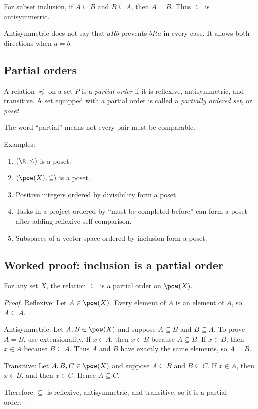 For subset inclusion, if $A\subseteq B$ and $B\subseteq A$, then $A=B$. Thus $\subseteq$ is antisymmetric.

\begin{trapbox}
Antisymmetric does not say that $aRb$ prevents $bRa$ in every case. It allows both directions when $a=b$.
\end{trapbox}

\subsection{Partial orders}

\begin{definition}
A relation $\preceq$ on a set $P$ is a \emph{partial order} if it is reflexive, antisymmetric, and transitive. A set equipped with a partial order is called a \emph{partially ordered set}, or \emph{poset}.
\end{definition}

The word ``partial'' means not every pair must be comparable.

Examples:

\begin{enumerate}
\item $(\R,\leq)$ is a poset.
\item $(\pow(X),\subseteq)$ is a poset.
\item Positive integers ordered by divisibility form a poset.
\item Tasks in a project ordered by ``must be completed before'' can form a poset after adding reflexive self-comparison.
\item Subspaces of a vector space ordered by inclusion form a poset.
\end{enumerate}

\subsection{Worked proof: inclusion is a partial order}

\begin{theorem}
For any set $X$, the relation $\subseteq$ is a partial order on $\pow(X)$.
\end{theorem}

\begin{proof}
Reflexive: Let $A\in\pow(X)$. Every element of $A$ is an element of $A$, so $A\subseteq A$.

Antisymmetric: Let $A,B\in\pow(X)$ and suppose $A\subseteq B$ and $B\subseteq A$. To prove $A=B$, use extensionality. If $x\in A$, then $x\in B$ because $A\subseteq B$. If $x\in B$, then $x\in A$ because $B\subseteq A$. Thus $A$ and $B$ have exactly the same elements, so $A=B$.

Transitive: Let $A,B,C\in\pow(X)$ and suppose $A\subseteq B$ and $B\subseteq C$. If $x\in A$, then $x\in B$, and then $x\in C$. Hence $A\subseteq C$.

Therefore $\subseteq$ is reflexive, antisymmetric, and transitive, so it is a partial order.
\end{proof}

